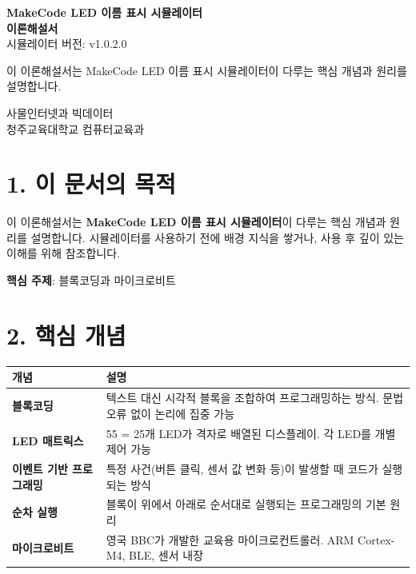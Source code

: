 \documentclass[11pt,a4paper]{article}
\begin{document}
\begin{titlepage}
\centering
\vspace*{3cm}
{\Huge\bfseries\color{primary} MakeCode LED 이름 표시 시뮬레이터}\\[0.5cm]
{\Huge\bfseries\color{primary} 이론해설서}
\\[1.5cm]
{\Large 시뮬레이터 버전: v1.0.2.0}
\\[2cm]
\begin{tcolorbox}[summarybox]
\centering
{\large 이 이론해설서는 MakeCode LED 이름 표시 시뮬레이터이 다루는 핵심 개념과 원리를 설명합니다.}
\end{tcolorbox}
\vfill
{\large 사물인터넷과 빅데이터}\\[0.3cm]
{\large 청주교육대학교 컴퓨터교육과}
\vspace{1cm}
\end{titlepage}

\section*{1. 이 문서의 목적}

이 이론해설서는 \textbf{MakeCode LED 이름 표시 시뮬레이터}이 다루는 핵심 개념과 원리를 설명합니다. 시뮬레이터를 사용하기 전에 배경 지식을 쌓거나, 사용 후 깊이 있는 이해를 위해 참조합니다.


\begin{tcolorbox}[summarybox]
\textbf{핵심 주제}: 블록코딩과 마이크로비트

\end{tcolorbox}


\section*{2. 핵심 개념}

\begin{center}
\renewcommand{\arraystretch}{1.4}
\begin{tabular}{|p{3.5cm}|p{11.5cm}|}
\hline
\rowcolor{tableheader}
\textbf{개념} & \textbf{설명} \\
\hline
\textbf{블록코딩} & 텍스트 대신 시각적 블록을 조합하여 프로그래밍하는 방식. 문법 오류 없이 논리에 집중 가능 \\
\hline
\textbf{LED 매트릭스} & 5\texttimes{}5 = 25개 LED가 격자로 배열된 디스플레이. 각 LED를 개별 제어 가능 \\
\hline
\textbf{이벤트 기반 프로그래밍} & 특정 사건(버튼 클릭, 센서 값 변화 등)이 발생할 때 코드가 실행되는 방식 \\
\hline
\textbf{순차 실행} & 블록이 위에서 아래로 순서대로 실행되는 프로그래밍의 기본 원리 \\
\hline
\textbf{마이크로비트} & 영국 BBC가 개발한 교육용 마이크로컨트롤러. ARM Cortex-M4, BLE, 센서 내장 \\
\hline
\end{tabular}
\end{center}
\end{document}
